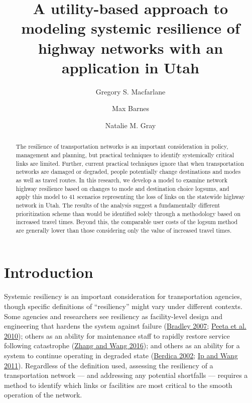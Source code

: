 \documentclass[]{ascelike-new}
\title{A utility-based approach to modeling systemic resilience of
highway networks with an application in Utah}
\author[1*]{Gregory S. Macfarlane}%
\affil[1*]{
	Brigham Young University, Civil and Construction Engineering
Department; 
	Email: gregmacfarlane@byu.edu
	; Corresponding author}
\author[2]{Max Barnes}%
\affil[2]{
	Kimley-Horn; 
	Email: maxbarnes@kha.com
	}
\author[3]{Natalie M. Gray}%
\affil[3]{
	WSP; 
	Email: nat.gray2000@gmail.com
	}
\begin{document}
\maketitle

\begin{abstract}
	The resilience of transportation networks is an important consideration
in policy, management and planning, but practical techniques to identify
systemically critical links are limited. Further, current practical
techniques ignore that when transportation networks are damaged or
degraded, people potentially change destinations and modes as well as
travel routes. In this research, we develop a model to examine network
highway resilience based on changes to mode and destination choice
logsums, and apply this model to 41 scenarios representing the loss of
links on the statewide highway network in Utah. The results of the
analysis suggest a fundamentally different prioritization scheme than
would be identified solely through a methodology based on increased
travel times. Beyond this, the comparable user costs of the logsum
method are generally lower than those considering only the value of
increased travel times.
\end{abstract}

\par
\vspace{1em}
\ifdefined\Shaded\renewenvironment{Shaded}{\begin{tcolorbox}[borderline west={3pt}{0pt}{shadecolor}, enhanced, boxrule=0pt, frame hidden, interior hidden, sharp corners, breakable]}{\end{tcolorbox}}\fi


\hypertarget{intro}{%
\section{Introduction}\label{intro}}

Systemic resiliency is an important consideration for transportation
agencies, though specific definitions of ``resiliency'' might vary under
different contexts. Some agencies and researchers see resiliency as
facility-level design and engineering that hardens the system against
failure (\protect\hyperlink{ref-bradley2007}{Bradley 2007};
\protect\hyperlink{ref-peeta2010}{Peeta et al. 2010}); others as an
ability for maintenance staff to rapidly restore service following
catastrophe (\protect\hyperlink{ref-zhang2016}{Zhang and Wang 2016});
and others as an ability for a system to continue operating in degraded
state (\protect\hyperlink{ref-berdica2002}{Berdica 2002};
\protect\hyperlink{ref-ip2011}{Ip and Wang 2011}). Regardless of the
definition used, assessing the resiliency of a transportation network
--- and addressing any potential shortfalls --- requires a method to
identify which links or facilities are most critical to the smooth
operation of the network.
\end{document}
